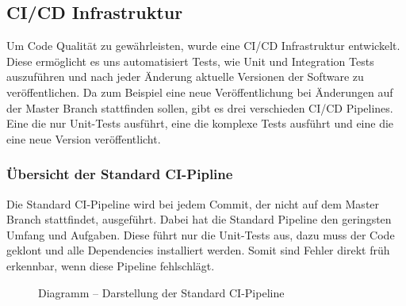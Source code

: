 \subsection{CI/CD Infrastruktur}
Um Code Qualität zu gewährleisten, wurde eine \ac{CI/CD} Infrastruktur entwickelt.
Diese ermöglicht es uns automatisiert Tests, wie Unit und Integration Tests auszuführen und nach jeder Änderung aktuelle Versionen der Software zu veröffentlichen.
Da zum Beispiel eine neue Veröffentlichung bei Änderungen auf der Master Branch stattfinden sollen, gibt es drei verschieden \ac{CI/CD} Pipelines.
Eine die nur Unit-Tests ausführt, eine die komplexe Tests ausführt und eine die eine neue Version veröffentlicht.

\subsubsection{Übersicht der Standard \ac{CI}-Pipline}
Die Standard \ac{CI}-Pipeline wird bei jedem Commit, der nicht auf dem Master Branch stattfindet, ausgeführt. Dabei hat die Standard Pipeline den geringsten Umfang und Aufgaben.
Diese führt nur die Unit-Tests aus, dazu muss der Code geklont und alle Dependencies installiert werden. Somit sind  Fehler direkt früh erkennbar, wenn diese Pipeline fehlschlägt.
\begin{figure}[!htbp]
    \centering    
    \usetikzlibrary{positioning}
\caption{Diagramm – Darstellung der Standard \ac{CI}-Pipeline}
\end{figure}

